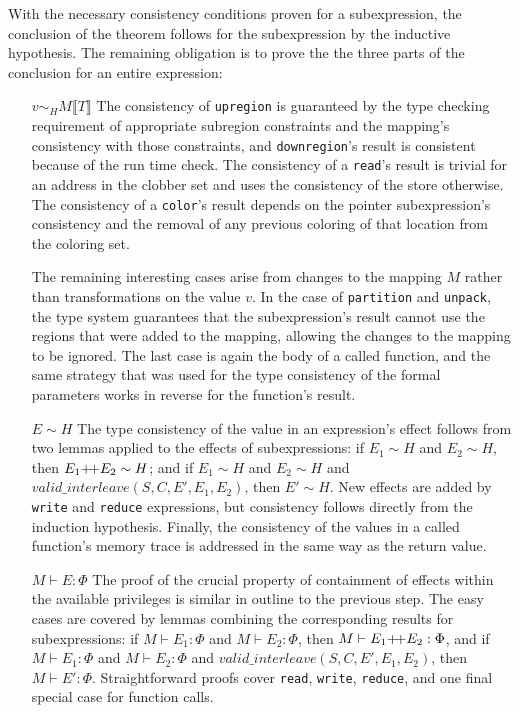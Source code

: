 With the necessary consistency conditions proven for a subexpression, the conclusion of the theorem follows for
the subexpression by the inductive hypothesis.  The remaining obligation is to prove the the three parts of the
conclusion for an entire expression:
\begin{itemize}

\item[$v \sim_H M \llbracket T \rrbracket$]    The consistency of 
{\tt upregion} is guaranteed by the type checking requirement of appropriate subregion
constraints and the mapping's consistency with those constraints, and {\tt downregion}'s
result is consistent because of the run time check.  
The consistency of a {\tt read}'s result is trivial for an address in the
clobber set and uses the consistency of the store otherwise.  The consistency of a 
{\tt color}'s result depends on the pointer subexpression's consistency and the 
removal of any previous coloring of that location from the coloring set.  

The remaining interesting cases arise from changes to the mapping $M$ rather than transformations on the
value $v$.  In the case of {\tt partition} and {\tt unpack}, the type system
guarantees that the subexpression's result cannot use the regions that were added to the
mapping, allowing the changes to the mapping to be ignored.  The last case is again the body
of a called function, and the same strategy that was used for the type consistency of the
formal parameters works in reverse for the function's result.

\item[$E \sim H$] The type consistency of the value in an expression's effect follows from two lemmas applied to the effects
of subexpressions:
if $E_1 \sim H$ and $E_2 \sim H$, then $E_1 \text{+\!+} E_2 \sim H$; and 
if $E_1 \sim H$ and $E_2 \sim H$ and $valid\_interleave(S, C, E', E_1, E_2)$, then $E' \sim H$.
New effects are added by {\tt write} and {\tt reduce} expressions, but consistency follows
directly from the induction hypothesis.  Finally, the consistency of the
values in a called function's memory trace is addressed in the same way as the return value.

\item[$M \vdash E : \Phi$] The proof of the crucial property of containment of effects within the available privileges
is similar in outline to the previous step.  The easy cases are covered by lemmas combining the corresponding results
for subexpressions: if $M \vdash E_1 : \Phi$ and $M \vdash E_2 : \Phi$, then $M \vdash E_1 \text{+\!+} E_2 : \Phi$, and
if $M \vdash E_1 : \Phi$ and $M \vdash E_2 : \Phi$ and $valid\_interleave(S, C, E', E_1, E_2)$, then $M \vdash E' : \Phi$.
Straightforward proofs cover {\tt read}, {\tt write}, {\tt reduce}, and one final special case for function calls. 
\end{itemize}

